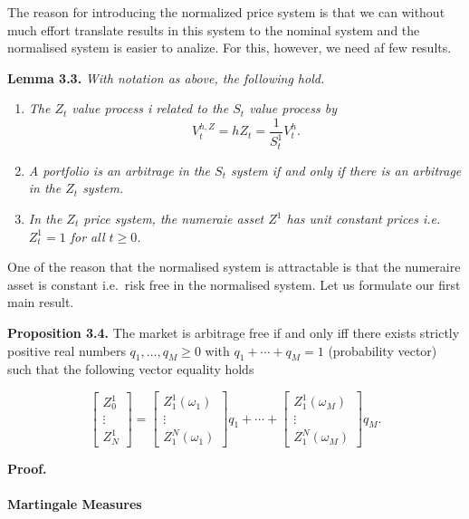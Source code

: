 \documentclass[
]{article}
\providecommand{\tightlist}{%
  \setlength{\itemsep}{0pt}\setlength{\parskip}{0pt}}
\begin{document}
The reason for introducing the normalized price system is that we can
without much effort translate results in this system to the nominal
system and the normalised system is easier to analize. For this,
however, we need af few results.

\textbf{Lemma 3.3.} \emph{With notation as above, the following hold.}

\begin{enumerate}
\def\labelenumi{\arabic{enumi}.}
\tightlist
\item
  \emph{The \(Z_t\) value process i related to the \(S_t\) value process
  by} \[
    V_t^{h,Z}=hZ_t=\frac{1}{S_t^1}V_t^h.
    \]
\item
  \emph{A portfolio is an arbitrage in the \(S_t\) system if and only if
  there is an arbitrage in the \(Z_t\) system.}
\item
  \emph{In the \(Z_t\) price system, the numeraie asset \(Z^1\) has unit
  constant prices i.e.~\(Z_t^1=1\) for all \(t\ge 0\).}
\end{enumerate}

One of the reason that the normalised system is attractable is that the
numeraire asset is constant i.e.~risk free in the normalised system. Let
us formulate our first main result.

\textbf{Proposition 3.4.} The market is arbitrage free if and only iff
there exists strictly positive real numbers \(q_1,...,q_M\ge 0\) with
\(q_1+\cdots + q_M=1\) (probability vector) such that the following
vector equality holds

\[
\begin{bmatrix} Z_0^1\\
\vdots\\
Z_N^1\end{bmatrix}=\begin{bmatrix} Z_1^1(\omega_1)\\
\vdots\\
Z_1^N(\omega_1)\end{bmatrix}q_1+\cdots +\begin{bmatrix} Z_1^1(\omega_M)\\
\vdots\\
Z_1^N(\omega_M)\end{bmatrix}q_M.\tag{3.3}
\]

\textbf{Proof.}

\hypertarget{martingale-measures}{%
\paragraph{Martingale Measures}\label{martingale-measures}}
\end{document}
